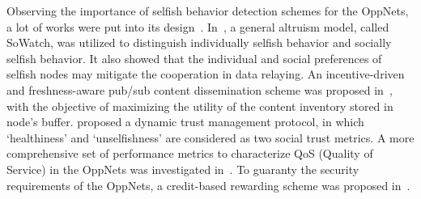 Observing the importance of selfish behavior detection
schemes for the OppNets,
a lot of works were
put into its design~\cite{DBLP:journals/fgcs/JedariXCDTA19, Zhou2015Incentive, Chen2014Dynamic, DBLP:journals/tdsc/ChoC18, Wang2016A}.
In~\cite{DBLP:journals/fgcs/JedariXCDTA19},
a general altruism model,
called SoWatch,
was utilized to
distinguish individually selfish behavior
and socially selfish behavior.
It also showed that the individual
and social preferences of selfish nodes
may mitigate the cooperation in data relaying.
An incentive-driven and freshness-aware
pub/sub content dissemination scheme
was proposed in~\cite{Zhou2015Incentive},
with the objective of
maximizing the utility of the content inventory
stored in node's buffer.
\cite{Chen2014Dynamic} proposed a dynamic trust management protocol,
in which `healthiness' and
`unselfishness' are considered as two social trust metrics.
A more comprehensive set of performance metrics to characterize QoS (Quality of Service)
in the OppNets
was investigated in~\cite{DBLP:journals/tdsc/ChoC18}.
To guaranty the security requirements of the OppNets,
a credit-based
rewarding scheme was proposed in~\cite{Wang2016A}.

